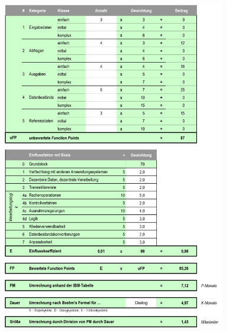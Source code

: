 \begin{appendix}
  	\begin{figure}[ht]
	\centering
	\includegraphics[width=0.87\textwidth]{./files/Aufwand}
	\label{fig:Aufwand}
	\end{figure}

  \end{appendix}

			  

